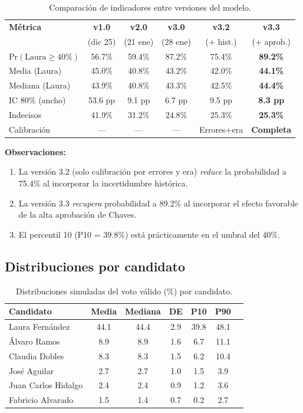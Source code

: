 \documentclass[11pt,a4paper]{article}
\newcommand{\prob}[1]{\text{Pr}(#1)}
\begin{document}
\begin{table}[H]
\centering
\caption{Comparación de indicadores entre versiones del modelo.}
\label{tab:comparacion}
\begin{tabular}{@{}lccccc@{}}
\toprule
\textbf{Métrica} & \textbf{v1.0} & \textbf{v2.0} & \textbf{v3.0} & \textbf{v3.2} & \textbf{v3.3} \\
& (dic 25) & (21 ene) & (28 ene) & (+ hist.) & (+ aprob.) \\
\midrule
$\prob{\text{Laura} \geq 40\%}$ & 56.7\% & 59.4\% & 87.2\% & 75.4\% & \textbf{89.2\%} \\
Media (Laura) & 45.0\% & 40.8\% & 43.2\% & 42.0\% & \textbf{44.1\%} \\
Mediana (Laura) & 43.9\% & 40.8\% & 43.3\% & 42.5\% & \textbf{44.4\%} \\
IC 80\% (ancho) & 53.6 pp & 9.1 pp & 6.7 pp & 9.5 pp & \textbf{8.3 pp} \\
Indecisos & 41.9\% & 31.2\% & 24.8\% & 25.3\% & \textbf{25.3\%} \\
Calibración & --- & --- & --- & Errores+era & \textbf{Completa} \\
\bottomrule
\end{tabular}
\end{table}

\textbf{Observaciones:}
\begin{enumerate}
    \item La versión 3.2 (solo calibración por errores y era) \textit{reduce} la probabilidad a 75.4\% al incorporar la incertidumbre histórica.
    \item La versión 3.3 \textit{recupera} probabilidad a 89.2\% al incorporar el efecto favorable de la alta aprobación de Chaves.
    \item El percentil 10 (P10 = 39.8\%) está prácticamente en el umbral del 40\%.
\end{enumerate}

\subsection{Distribuciones por candidato}

\begin{table}[H]
\centering
\caption{Distribuciones simuladas del voto válido (\%) por candidato.}
\label{tab:distribuciones}
\begin{tabular}{@{}lcccccc@{}}
\toprule
\textbf{Candidato} & \textbf{Media} & \textbf{Mediana} & \textbf{DE} & \textbf{P10} & \textbf{P90} \\
\midrule
Laura Fernández & 44.1 & 44.4 & 2.9 & 39.8 & 48.1 \\
Álvaro Ramos & 8.9 & 8.9 & 1.6 & 6.7 & 11.1 \\
Claudia Dobles & 8.3 & 8.3 & 1.5 & 6.2 & 10.4 \\
José Aguilar & 2.7 & 2.7 & 1.0 & 1.5 & 3.9 \\
Juan Carlos Hidalgo & 2.4 & 2.4 & 0.9 & 1.2 & 3.6 \\
Fabricio Alvarado & 1.5 & 1.4 & 0.7 & 0.2 & 2.7 \\
\bottomrule
\end{tabular}
\end{table}
\end{document}
